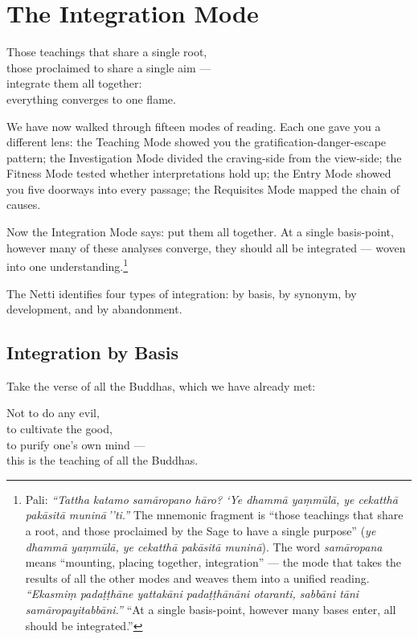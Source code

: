 \chapter{The Integration Mode}
\label{ch:integration}

\begin{versebox}
Those teachings that share a single root,\\
those proclaimed to share a single aim ---\\
integrate them all together:\\
everything converges to one flame.
\end{versebox}

\noindent We have now walked through fifteen modes of reading. Each one gave you a different lens: the Teaching Mode showed you the gratification-danger-escape pattern; the Investigation Mode divided the craving-side from the view-side; the Fitness Mode tested whether interpretations hold up; the Entry Mode showed you five doorways into every passage; the Requisites Mode mapped the chain of causes.

Now the Integration Mode says: put them all together. At a single basis-point, however many of these analyses converge, they should all be integrated --- woven into one understanding.\footnote{Pali: \textit{``Tattha katamo samāropano hāro? `Ye dhammā yaṃmūlā, ye cekatthā pakāsitā muninā\,''ti.''} The mnemonic fragment is ``those teachings that share a root, and those proclaimed by the Sage to have a single purpose'' (\textit{ye dhammā yaṃmūlā, ye cekatthā pakāsitā muninā}). The word \textit{samāropana} means ``mounting, placing together, integration'' --- the mode that takes the results of all the other modes and weaves them into a unified reading. \textit{``Ekasmiṃ padaṭṭhāne yattakāni padaṭṭhānāni otaranti, sabbāni tāni samāropayitabbāni.''} ``At a single basis-point, however many bases enter, all should be integrated.''}

The Netti identifies four types of integration: by basis, by synonym, by development, and by abandonment.

\section*{Integration by Basis}

Take the verse of all the Buddhas, which we have already met:

\begin{versebox}
Not to do any evil,\\
to cultivate the good,\\
to purify one's own mind ---\\
this is the teaching of all the Buddhas.
\end{versebox}

